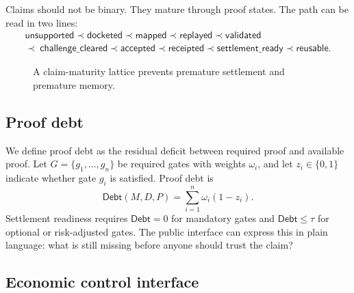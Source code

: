 Claims should not be binary. They mature through proof states. The path can be read in two lines:
\[
\begin{array}{c}
\textsf{unsupported} \prec \textsf{docketed} \prec \textsf{mapped} \prec \textsf{replayed} \prec \textsf{validated} \\
\prec\ \textsf{challenge\_cleared} \prec \textsf{accepted} \prec \textsf{receipted} \prec \textsf{settlement\_ready} \prec \textsf{reusable}.
\end{array}
\]

\begin{figure}[h]
\centering
{}
\caption{A claim-maturity lattice prevents premature settlement and premature memory.}
\label{fig:lattice}
\end{figure}

\subsection{Proof debt}

We define proof debt as the residual deficit between required proof and available proof. Let $G=\{g_1,\dots,g_n\}$ be required gates with weights $\omega_i$, and let $z_i\in\{0,1\}$ indicate whether gate $g_i$ is satisfied. Proof debt is
\[
  \mathsf{Debt}(M,D,P)=\sum_{i=1}^{n}\omega_i(1-z_i).
\]
Settlement readiness requires $\mathsf{Debt}=0$ for mandatory gates and $\mathsf{Debt}\leq\tau$ for optional or risk-adjusted gates. The public interface can express this in plain language: what is still missing before anyone should trust the claim?

\subsection{Economic control interface}

